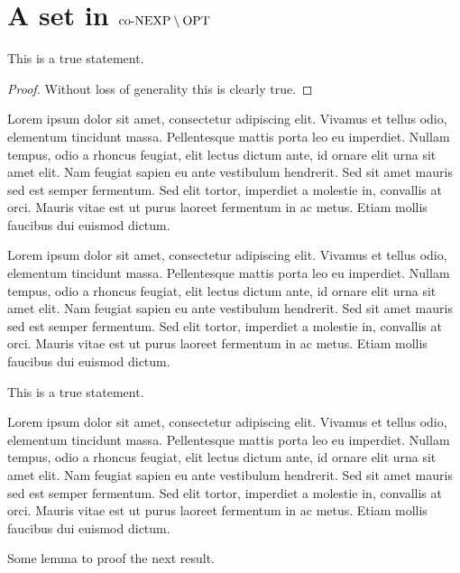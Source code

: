 \chapter{A set in $\text{co-NEXP} \setminus \text{OPT}$}
  \begin{theorem}
    This is a true statement.
  \end{theorem}
  \begin{proof}
    Without loss of generality this is clearly true.
  \end{proof}

  Lorem ipsum dolor sit amet, consectetur adipiscing elit. Vivamus et tellus odio, elementum tincidunt massa. Pellentesque mattis porta leo eu imperdiet. Nullam tempus, odio a rhoncus feugiat, elit lectus dictum ante, id ornare elit urna sit amet elit. Nam feugiat sapien eu ante vestibulum hendrerit. Sed sit amet mauris sed est semper fermentum. Sed elit tortor, imperdiet a molestie in, convallis at orci. Mauris vitae est ut purus laoreet fermentum in ac metus. Etiam mollis faucibus dui euismod dictum.

  Lorem ipsum dolor sit amet, consectetur adipiscing elit. Vivamus et tellus odio, elementum tincidunt massa. Pellentesque mattis porta leo eu imperdiet. Nullam tempus, odio a rhoncus feugiat, elit lectus dictum ante, id ornare elit urna sit amet elit. Nam feugiat sapien eu ante vestibulum hendrerit. Sed sit amet mauris sed est semper fermentum. Sed elit tortor, imperdiet a molestie in, convallis at orci. Mauris vitae est ut purus laoreet fermentum in ac metus. Etiam mollis faucibus dui euismod dictum.  
  
  \begin{theorem}
    This is a true statement.
  \end{theorem}  

  Lorem ipsum dolor sit amet, consectetur adipiscing elit. Vivamus et tellus odio, elementum tincidunt massa. Pellentesque mattis porta leo eu imperdiet. Nullam tempus, odio a rhoncus feugiat, elit lectus dictum ante, id ornare elit urna sit amet elit. Nam feugiat sapien eu ante vestibulum hendrerit. Sed sit amet mauris sed est semper fermentum. Sed elit tortor, imperdiet a molestie in, convallis at orci. Mauris vitae est ut purus laoreet fermentum in ac metus. Etiam mollis faucibus dui euismod dictum.

  \begin{lemma}
    Some lemma to proof the next result.
  \end{lemma}
